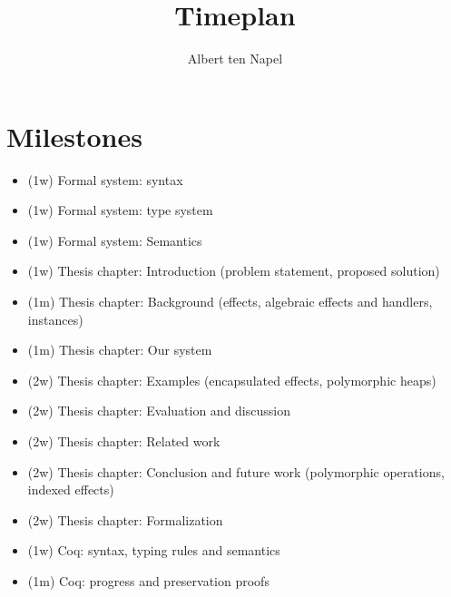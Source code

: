 \documentclass[12pt]{article}
\title{Timeplan}
\author{Albert ten Napel}
\date{}
\begin{document}
\maketitle

\section{Milestones}
\begin{itemize}
\item (1w) Formal system: syntax
\item (1w) Formal system: type system
\item (1w) Formal system: Semantics
\item (1w) Thesis chapter: Introduction (problem statement, proposed solution)
\item (1m) Thesis chapter: Background (effects, algebraic effects and handlers, instances)
\item (1m) Thesis chapter: Our system
\item (2w) Thesis chapter: Examples (encapsulated effects, polymorphic heaps)
\item (2w) Thesis chapter: Evaluation and discussion
\item (2w) Thesis chapter: Related work
\item (2w) Thesis chapter: Conclusion and future work (polymorphic operations, indexed effects)

\item (2w) Thesis chapter: Formalization
\item (1w) Coq: syntax, typing rules and semantics
\item (1m) Coq: progress and preservation proofs
\end{itemize}
\end{document}
